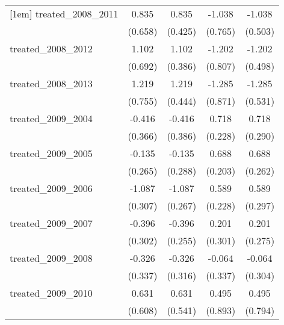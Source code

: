 {\begin{tabular}{l*{4}{c}}
[1em]
treated\_2008\_2011&       0.835         &       0.835\sym{*}  &      -1.038         &      -1.038\sym{*}  \\
            &     (0.658)         &     (0.425)         &     (0.765)         &     (0.503)         \\
[1em]
treated\_2008\_2012&       1.102         &       1.102\sym{**} &      -1.202         &      -1.202\sym{*}  \\
            &     (0.692)         &     (0.386)         &     (0.807)         &     (0.498)         \\
[1em]
treated\_2008\_2013&       1.219         &       1.219\sym{**} &      -1.285         &      -1.285\sym{*}  \\
            &     (0.755)         &     (0.444)         &     (0.871)         &     (0.531)         \\
[1em]
treated\_2009\_2004&      -0.416         &      -0.416         &       0.718\sym{**} &       0.718\sym{*}  \\
            &     (0.366)         &     (0.386)         &     (0.228)         &     (0.290)         \\
[1em]
treated\_2009\_2005&      -0.135         &      -0.135         &       0.688\sym{***}&       0.688\sym{**} \\
            &     (0.265)         &     (0.288)         &     (0.203)         &     (0.262)         \\
[1em]
treated\_2009\_2006&      -1.087\sym{***}&      -1.087\sym{***}&       0.589\sym{**} &       0.589\sym{*}  \\
            &     (0.307)         &     (0.267)         &     (0.228)         &     (0.297)         \\
[1em]
treated\_2009\_2007&      -0.396         &      -0.396         &       0.201         &       0.201         \\
            &     (0.302)         &     (0.255)         &     (0.301)         &     (0.275)         \\
[1em]
treated\_2009\_2008&      -0.326         &      -0.326         &      -0.064         &      -0.064         \\
            &     (0.337)         &     (0.316)         &     (0.337)         &     (0.304)         \\
[1em]
treated\_2009\_2010&       0.631         &       0.631         &       0.495         &       0.495         \\
            &     (0.608)         &     (0.541)         &     (0.893)         &     (0.794)         \\

\end{tabular}}
